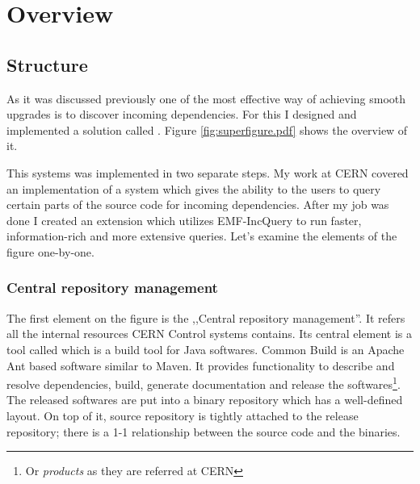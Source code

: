 \chapter{Overview}

\section{Structure}
As it was discussed previously one of the most effective  way of achieving
smooth upgrades is to discover incoming dependencies. For this I designed and
implemented a solution called \ptool{}.  Figure \autoref{fig:superfigure.pdf} shows the overview of
it.


This systems was implemented in two separate steps. My work at CERN covered an
implementation of a system which gives the ability to the users to query certain
parts of the source code for incoming dependencies. After my job was done I
created an extension which utilizes EMF-IncQuery to run faster, information-rich
and more extensive queries. Let's examine the elements of the figure one-by-one.

\subsection{Central repository management}
The first element on the figure is the ,,Central repository management''. It
refers all the internal resources CERN Control systems contains. Its central
element is a tool called  which is a build tool for Java
softwares. Common Build is an Apache Ant based software similar to Maven. It
provides functionality to describe and resolve dependencies, build, generate
documentation and release the softwares\footnote{Or \textit{products} as they
are referred at CERN}. The released softwares are put into a binary repository
which has a well-defined layout. On top of it, source repository is tightly
attached to the release repository; there is a 1-1 relationship between the
source code and the binaries.

